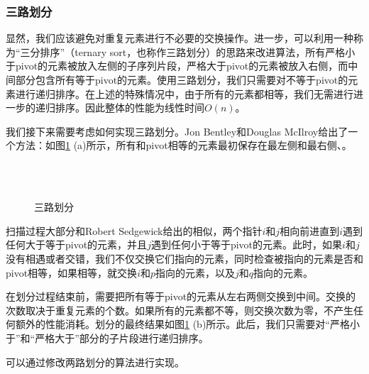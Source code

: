 \documentclass[UTF8]{article}
\begin{document}
\subsubsection{三路划分}

显然，我们应该避免对重复元素进行不必要的交换操作。进一步，可以利用一种称为“三分排序”（ternary sort，也称作三路划分）的思路来改进算法，所有严格小于pivot的元素被放入左侧的子序列片段，严格大于pivot的元素被放入右侧，而中间部分包含所有等于pivot的元素。使用三路划分，我们只需要对不等于pivot的元素进行递归排序。在上述的特殊情况中，由于所有的元素都相等，我们无需进行进一步的递归排序。因此整体的性能为线性时间$O(n)$。

我们接下来需要考虑如何实现三路划分。Jon Bentley和Douglas McIlroy给出了一个方法：如图\ref{fig:partition-3-way} (a)所示，所有和pivot相等的元素最初保存在最左侧和最右侧\cite{3-way-part}、\cite{opt-qs}。

\begin{figure}[htbp]
   \centering
    \\
    \\
   \caption{三路划分}
   \label{fig:partition-3-way}
\end{figure}

扫描过程大部分和Robert Sedgewick给出的相似，两个指针$i$和$j$相向前进直到$i$遇到任何大于等于pivot的元素，并且$j$遇到任何小于等于pivot的元素。此时，如果$i$和$j$没有相遇或者交错，我们不仅交换它们指向的元素，同时检查被指向的元素是否和pivot相等，如果相等，就交换$i$和$p$指向的元素，以及$j$和$q$指向的元素。

在划分过程结束前，需要把所有等于pivot的元素从左右两侧交换到中间。交换的次数取决于重复元素的个数。如果所有的元素都不等，则交换次数为零，不产生任何额外的性能消耗。划分的最终结果如图\ref{fig:partition-3-way} (b)所示。此后，我们只需要对“严格小于”和“严格大于”部分的子片段进行递归排序。

可以通过修改两路划分的算法进行实现。
\end{document}
